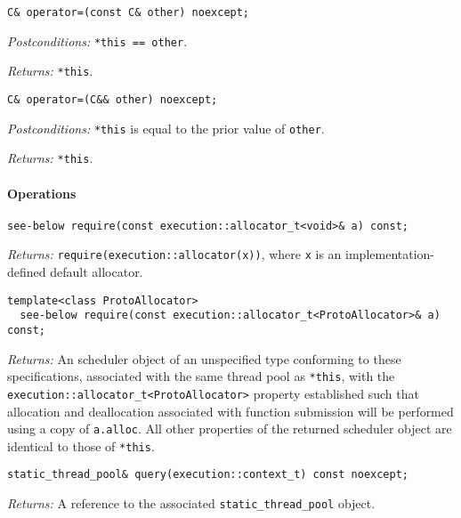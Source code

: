 \documentclass[a4paper,12pt,notitlepage,twoside,openright]{article}
\begin{document}
\begin{verbatim}
C& operator=(const C& other) noexcept;
\end{verbatim}

\emph{Postconditions:} \texttt{*this == other}.

\emph{Returns:} \texttt{*this}.

\begin{verbatim}
C& operator=(C&& other) noexcept;
\end{verbatim}

\emph{Postconditions:} \texttt{*this} is equal to the prior
value of \texttt{other}.

\emph{Returns:} \texttt{*this}.

\hypertarget{operations}{%
\paragraph{Operations}\label{operations}}

\begin{verbatim}
see-below require(const execution::allocator_t<void>& a) const;
\end{verbatim}

\emph{Returns:} \texttt{require(execution::allocator(x))},
where \texttt{x} is an implementation-defined default
allocator.

\begin{verbatim}
template<class ProtoAllocator>
  see-below require(const execution::allocator_t<ProtoAllocator>& a) const;
\end{verbatim}

\emph{Returns:} An scheduler object of an unspecified type conforming to
these specifications, associated with the same thread pool as
\texttt{*this}, with the
\texttt{execution::allocator_t<ProtoAllocator>} property
established such that allocation and deallocation associated with
function submission will be performed using a copy of
\texttt{a.alloc}. All other properties of the returned
scheduler object are identical to those of \texttt{*this}.

\begin{verbatim}
static_thread_pool& query(execution::context_t) const noexcept;
\end{verbatim}

\emph{Returns:} A reference to the associated
\texttt{static_thread_pool} object.
\end{document}
